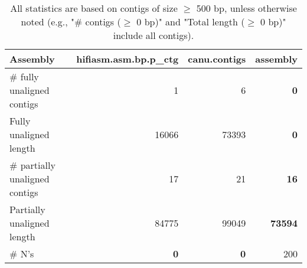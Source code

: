 \documentclass[12pt,a4paper]{article}
\begin{document}
\begin{table}[ht]
\begin{center}
\caption{All statistics are based on contigs of size $\geq$ 500 bp, unless otherwise noted (e.g., "\# contigs ($\geq$ 0 bp)" and "Total length ($\geq$ 0 bp)" include all contigs).}
\begin{tabular}{|l*{3}{|r}|}
\hline
Assembly & hifiasm.asm.bp.p\_ctg & canu.contigs & assembly \\ \hline
\# fully unaligned contigs & 1 & 6 & {\bf 0} \\ \hline
Fully unaligned length & 16066 & 73393 & {\bf 0} \\ \hline
\# partially unaligned contigs & 17 & 21 & {\bf 16} \\ \hline
Partially unaligned length & 84775 & 99049 & {\bf 73594} \\ \hline
\# N's & {\bf 0} & {\bf 0} & 200 \\ \hline
\end{tabular}
\end{center}
\end{table}
\end{document}
